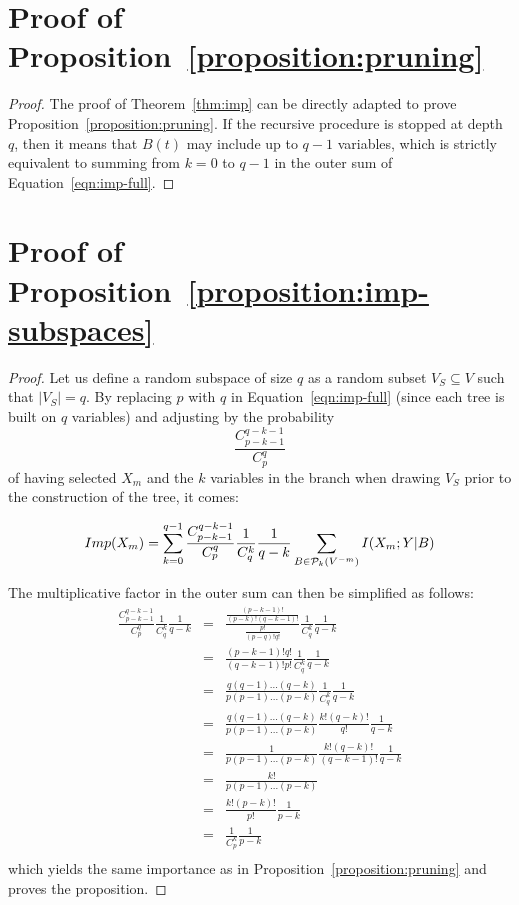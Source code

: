 \documentclass{article}
\begin{document}

\section{Proof of Proposition~\ref{proposition:pruning}}
\label{app:proposition:pruning}

\begin{proof}
The proof of Theorem~\ref{thm:imp} can be directly adapted to prove
Proposition~\ref{proposition:pruning}. If the recursive procedure is stopped at
depth $q$, then it means that $B(t)$ may include up to $q-1$ variables, which is
strictly equivalent to summing from $k=0$ to $q-1$ in the outer sum of
Equation~\ref{eqn:imp-full}.
\end{proof}


\section{Proof of Proposition~\ref{proposition:imp-subspaces}}
\label{app:proposition:imp-subspaces}

\begin{proof}
Let us define a random subspace of size $q$ as a random subset $V_S \subseteq V$
such that $|V_S|=q$. By replacing $p$ with $q$ in Equation~\ref{eqn:imp-full}
(since each tree is built on $q$ variables) and adjusting by the probability
$$\frac{C^{q-k-1}_{p-k-1}}{C^q_p}$$ of having selected $X_m$ and the $k$ variables in
the branch when drawing $V_S$ prior to the construction of the tree, it comes:

\begin{equation*}
Imp(X_m)=\sum_{k=0}^{q-1} \frac{C^{q-k-1}_{p-k-1}}{C^q_p} \frac{1}{C_q^k} \frac{1}{q-k} \sum_{B \in {\cal P}_k(V^{-m})} I(X_m;Y|B)
\end{equation*}

The multiplicative factor in the outer sum can then be simplified as follows:
\begin{eqnarray*}
\frac{C^{q-k-1}_{p-k-1}}{C^q_p} \frac{1}{C_q^k} \frac{1}{q-k} &=& \frac{\frac{(p-k-1)!}{(p-k)!(q-k-1)!}}{\frac{p!}{(p-q)!q!}} \frac{1}{C_q^k} \frac{1}{q-k}\\
&=& \frac{(p-k-1)!q!}{(q-k-1)!p!} \frac{1}{C_q^k} \frac{1}{q-k} \\
&=& \frac{q(q-1) ... (q-k)}{p(p-1) ... (p-k)} \frac{1}{C_q^k} \frac{1}{q-k}\\
&=& \frac{q(q-1) ... (q-k)}{p(p-1) ... (p-k)} \frac{k!(q-k)!}{q!} \frac{1}{q-k}\\
&=& \frac{1}{p(p-1) ... (p-k)} \frac{k!(q-k)!}{(q-k-1)!} \frac{1}{q-k}\\
&=& \frac{k!}{p(p-1) ... (p-k)} \\
&=& \frac{k!(p-k)!}{p!} \frac{1}{p-k} \\
&=& \frac{1}{C^k_p} \frac{1}{p-k} \\
\end{eqnarray*}
which  yields the same importance as in Proposition~\ref{proposition:pruning} and proves the
proposition.
\end{proof}
\end{document}
